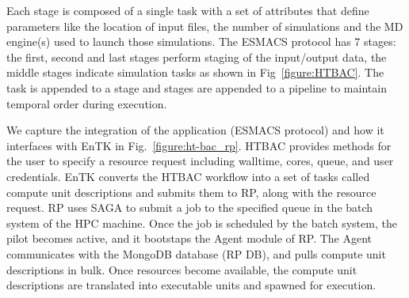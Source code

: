 
Each stage is composed of a single %
task with
a set of attributes that define %
parameters %
like the location of input files, the number of simulations and the MD
engine(s) used to launch those simulations. The ESMACS protocol %
has 7 stages: %
the first, second and last stages perform staging of the input/output data,
the middle stages indicate simulation tasks as shown in
Fig~\ref{figure:HTBAC}. The task is appended to a stage and stages are
appended to a pipeline to maintain temporal order during execution. 



We capture the integration of the application (ESMACS protocol) and how it
interfaces with EnTK in Fig.~\ref{figure:ht-bac_rp}. HTBAC provides methods
for the user to specify a resource request including walltime, cores, queue,
and user credentials. EnTK converts the HTBAC workflow into a set of tasks
called compute unit descriptions and submits them to RP, along with the
resource request. RP uses SAGA to submit a job to the specified queue in the
batch system of the HPC machine. Once the job is scheduled by the batch
system, the pilot becomes active, and it bootstaps the Agent module of RP\@.
The Agent communicates with the MongoDB database (RP DB), and pulls compute
unit descriptions in bulk. Once resources become available, the compute unit
descriptions are translated into executable units and spawned for execution.

